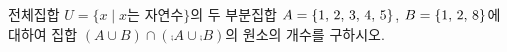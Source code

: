 전체집합 $U=\{x \mid x$는 자연수$\}$의 두 부분집합 $A=\{1,\mkern3mu 2,\mkern3mu 3,\mkern3mu 4,\mkern3mu 5\}$, $B=\{1,\mkern3mu 2,\mkern3mu 8\}$에 대하여 집합 $(A\cup B)\cap(\comp{A}\cup\comp{B})$의 원소의 개수를 구하시오.
